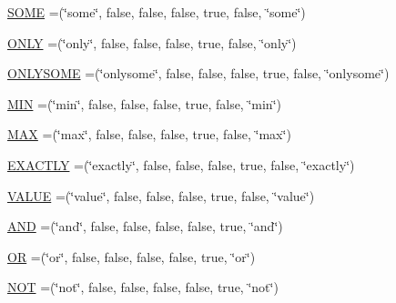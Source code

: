 \begin{DoxyCompactItemize}
\item 
\hyperlink{enumorg_1_1coode_1_1owlapi_1_1manchesterowlsyntax_1_1_manchester_o_w_l_syntax_a18c459e0f6a65d2c2651211e3a688bd2}{S\-O\-M\-E} =(\char`\"{}some\char`\"{}, false, false, false, true, false, \char`\"{}some\char`\"{})
\item 
\hyperlink{enumorg_1_1coode_1_1owlapi_1_1manchesterowlsyntax_1_1_manchester_o_w_l_syntax_aee7d111fff0425176cc98c0bbb632a28}{O\-N\-L\-Y} =(\char`\"{}only\char`\"{}, false, false, false, true, false, \char`\"{}only\char`\"{})
\item 
\hyperlink{enumorg_1_1coode_1_1owlapi_1_1manchesterowlsyntax_1_1_manchester_o_w_l_syntax_aecfb5796fba3315b1881acaa813a247d}{O\-N\-L\-Y\-S\-O\-M\-E} =(\char`\"{}onlysome\char`\"{}, false, false, false, true, false, \char`\"{}onlysome\char`\"{})
\item 
\hyperlink{enumorg_1_1coode_1_1owlapi_1_1manchesterowlsyntax_1_1_manchester_o_w_l_syntax_a37580c9b3eecbb45c7da269cf87a85f3}{M\-I\-N} =(\char`\"{}min\char`\"{}, false, false, false, true, false, \char`\"{}min\char`\"{})
\item 
\hyperlink{enumorg_1_1coode_1_1owlapi_1_1manchesterowlsyntax_1_1_manchester_o_w_l_syntax_ac542c0609b7d7290f3011504b2b4612d}{M\-A\-X} =(\char`\"{}max\char`\"{}, false, false, false, true, false, \char`\"{}max\char`\"{})
\item 
\hyperlink{enumorg_1_1coode_1_1owlapi_1_1manchesterowlsyntax_1_1_manchester_o_w_l_syntax_a6c89b665ce13b8d8eb2de6a8a3a16535}{E\-X\-A\-C\-T\-L\-Y} =(\char`\"{}exactly\char`\"{}, false, false, false, true, false, \char`\"{}exactly\char`\"{})
\item 
\hyperlink{enumorg_1_1coode_1_1owlapi_1_1manchesterowlsyntax_1_1_manchester_o_w_l_syntax_a1290ac68479e2a22e88f263cc61156e6}{V\-A\-L\-U\-E} =(\char`\"{}value\char`\"{}, false, false, false, true, false, \char`\"{}value\char`\"{})
\item 
\hyperlink{enumorg_1_1coode_1_1owlapi_1_1manchesterowlsyntax_1_1_manchester_o_w_l_syntax_a94288da803e553a9961a7740edb7a7f3}{A\-N\-D} =(\char`\"{}and\char`\"{}, false, false, false, false, true, \char`\"{}and\char`\"{})
\item 
\hyperlink{enumorg_1_1coode_1_1owlapi_1_1manchesterowlsyntax_1_1_manchester_o_w_l_syntax_af570a9b56bd00895e6b7ae7e3f7974fa}{O\-R} =(\char`\"{}or\char`\"{}, false, false, false, false, true, \char`\"{}or\char`\"{})
\item 
\hyperlink{enumorg_1_1coode_1_1owlapi_1_1manchesterowlsyntax_1_1_manchester_o_w_l_syntax_a7a711cc98f40c0eeb02e76f76f7e0762}{N\-O\-T} =(\char`\"{}not\char`\"{}, false, false, false, false, true, \char`\"{}not\char`\"{})

\end{DoxyCompactItemize}
